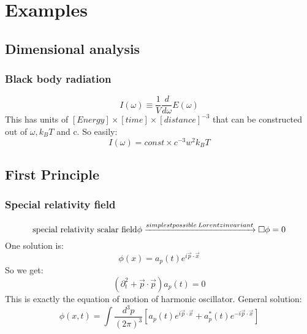 \chapter{Examples}

\section{Dimensional analysis}

\subsection{Black body radiation}
\[ I(\omega) \equiv \frac{1}{V}\frac{d}{d\omega}E(\omega)\]
This has units of $[Energy] \times [time] \times [distance]^{-3}$ that can
be constructed out of $\omega, k_{B}T$ and c. So easily:
\[ I(\omega) = const \times c^{-3}w^{2}k_{B}T \]

\section{First Principle}
\subsection{Special relativity field}
\[ \text{special relativity scalar field}\phi \xrightarrow{simplest possible
\\ Lorentz invariant} \Box\phi = 0 \]
One solution is: 
\[ \phi(x) = a_p(t)e^{i\vec{p}\cdot\vec{x}}\]
So we get:
\[ (\partial^2_t + \vec{p}\cdot\vec{p})a_p(t) = 0 \]
This is exactly the equation of motion of harmonic oscillator.
General solution:
\[ \phi(x,t) = \int \frac{d^{3}p}{(2\pi)^3} [a_p(t)e^{i\vec{p}\cdot\vec{x}}
+ a_p^*(t)e^{-i\vec{p}\cdot\vec{x}}]\]
